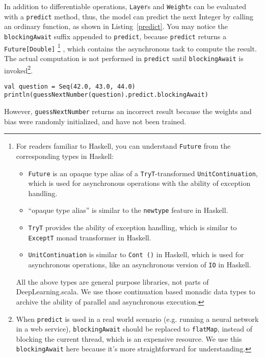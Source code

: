 In addition to differentiable operations, \lstinline{Layer}s and \lstinline{Weight}s can be evaluated with a \lstinline{predict} method, thus, the model can predict the next Integer by calling an ordinary function, as shown in Listing~\ref{predict}. 
You may notice the \lstinline{blockingAwait} suffix appended to \lstinline{predict}, because \lstinline{predict} returns a \lstinline{Future[Double]}
\footnote{ 
  For readers familiar to Haskell, you can understand \lstinline{Future} from the corresponding types in Haskell:
  \begin{itemize}
    \item \lstinline{Future} is an opaque type alias of a \lstinline{TryT}-transformed \lstinline{UnitContinuation}, which is used for asynchronous operations with the ability of exception handling.
    \item ``opaque type alias'' is similar to the \lstinline{newtype} feature in Haskell.
    \item \lstinline{TryT} provides the ability of exception handling, which is similar to \lstinline{ExceptT} monad transformer in Haskell.
    \item \lstinline{UnitContinuation} is similar to \lstinline{Cont ()} in Haskell, which is used for asynchronous operations, like an asynchronous version of \lstinline{IO} in Haskell.
  \end{itemize}
  All the above types are general purpose libraries, not parts of DeepLearning.scala. We use those continuation based monadic data types to archive the ability of parallel and asynchronous execution.
}
, which contains the asynchronous task to compute the result. The actual computation is not performed in  \lstinline{predict} until \lstinline{blockingAwait} is invoked\footnote{
  When \lstinline{predict} is used in a real world scenario (e.g. running a neural network in a web service), \lstinline{blockingAwait} should be replaced to \lstinline{flatMap}, instead of blocking the current thread, which is an expensive resource. We use this \lstinline{blockingAwait} here because it's more straightforward for understanding.
}.

\begin{lstlisting}[float={h t b p},caption={Inference on an untrained model},label={predict}]
val question = Seq(42.0, 43.0, 44.0)
println(guessNextNumber(question).predict.blockingAwait)
\end{lstlisting}

However, \lstinline{guessNextNumber} returns an incorrect result because the weights and bias were randomly initialized, and have not been trained.

